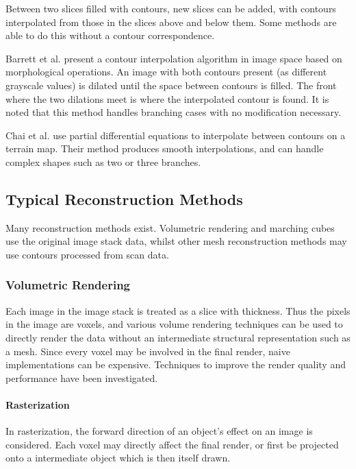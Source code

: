 \documentclass[11p, titlepage]{article}
\begin{document}
Between two slices filled with contours, new slices can be added, with contours interpolated from those in the slices above and below them. Some methods are able to do this without a contour correspondence.

Barrett et al. \cite{barrett1994image} present a contour interpolation algorithm in image space based on morphological operations. An image with both contours present (as different grayscale values) is dilated until the space between contours is filled. The front where the two dilations meet is where the interpolated contour is found. It is noted that this method handles branching cases with no modification necessary.

Chai et al. \cite{chai1998contour} use partial differential equations to interpolate between contours on a terrain map. Their method produces smooth interpolations, and can handle complex shapes such as two or three branches.

\subsection{Typical Reconstruction Methods}

Many reconstruction methods exist. Volumetric rendering and marching cubes use the original image stack data, whilst other mesh reconstruction methods may use contours processed from scan data.

\subsubsection{Volumetric Rendering}

Each image in the image stack is treated as a slice with thickness. Thus the pixels in the image are voxels, and various volume rendering techniques can be used to directly render the data without an intermediate structural representation such as a mesh. Since every voxel may be involved in the final render, naive implementations can be expensive. Techniques to improve the render quality and performance have been investigated.

\paragraph{Rasterization}

In rasterization, the forward direction of an object's effect on an image is considered. Each voxel may directly affect the final render, or first be projected onto a intermediate object which is then itself drawn.
\end{document}
